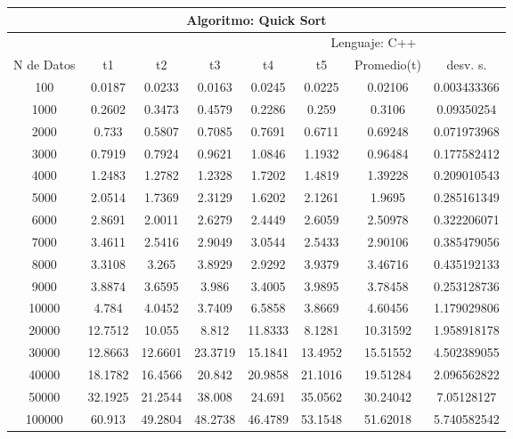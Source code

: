 \documentclass{article}
\begin{document}
    \begin{table}[]
        \begin{tabular}{|c|c|c|c|c|c|c|c| }
            \hline
            \multicolumn{8}{|c|}{Algoritmo: Quick Sort} \\ \hline
            \multicolumn{4}{|c|}{} & \multicolumn{4}{c|}{Lenguaje: C++} \\ \hline
              N de Datos &     t1    &  t2         &  t3          &   t4        &    t5     &   Promedio(t)       & desv. s. \\ \hline
                100	    &0.0187	&0.0233	&0.0163	&0.0245	&0.0225	&0.02106	&0.003433366 \\ \hline
                1000	&0.2602	&0.3473	&0.4579	&0.2286	&0.259	&0.3106	&0.09350254 \\ \hline
                2000	&0.733	&0.5807	&0.7085	&0.7691	&0.6711	&0.69248	&0.071973968 \\ \hline
                3000	&0.7919	&0.7924	&0.9621	&1.0846	&1.1932	&0.96484	&0.177582412 \\ \hline
                4000	&1.2483	&1.2782	&1.2328	&1.7202	&1.4819	&1.39228	&0.209010543 \\ \hline
                5000	&2.0514	&1.7369	&2.3129	&1.6202	&2.1261	&1.9695	&0.285161349 \\ \hline
                6000	&2.8691	&2.0011	&2.6279	&2.4449	&2.6059	&2.50978	&0.322206071 \\ \hline
                7000	&3.4611	&2.5416	&2.9049	&3.0544	&2.5433	&2.90106	&0.385479056 \\ \hline
                8000	&3.3108	&3.265	&3.8929	&2.9292	&3.9379	&3.46716	&0.435192133 \\ \hline
                9000	&3.8874	&3.6595	&3.986	&3.4005	&3.9895	&3.78458	&0.253128736 \\ \hline
                10000	&4.784	&4.0452	&3.7409	&6.5858	&3.8669	&4.60456	&1.179029806 \\ \hline
                20000	&12.7512	&10.055	&8.812	&11.8333	&8.1281	&10.31592&	1.958918178 \\ \hline
                30000	&12.8663	&12.6601	&23.3719	&15.1841	&13.4952	&15.51552&	4.502389055 \\ \hline
                40000	&18.1782	&16.4566	&20.842	&20.9858	&21.1016	&19.51284&	2.096562822 \\ \hline
                50000	&32.1925	&21.2544	&38.008	&24.691	&35.0562	&30.24042&	7.05128127 \\ \hline
                100000	&60.913	&49.2804	&48.2738	&46.4789	&53.1548	&51.62018&	5.740582542 \\ \hline

\end{tabular}
\end{table}
\end{document}
